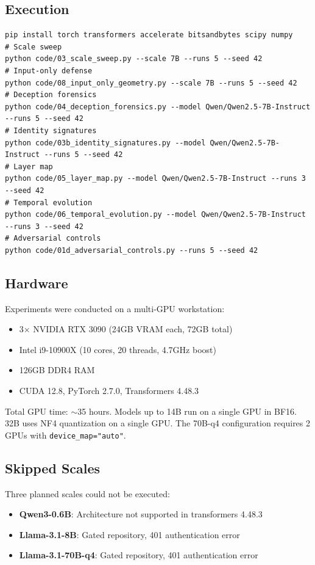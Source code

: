 \documentclass[11pt,a4paper]{article}
\begin{document}
\subsection{Execution}

\begin{verbatim}
pip install torch transformers accelerate bitsandbytes scipy numpy
# Scale sweep
python code/03_scale_sweep.py --scale 7B --runs 5 --seed 42
# Input-only defense
python code/08_input_only_geometry.py --scale 7B --runs 5 --seed 42
# Deception forensics
python code/04_deception_forensics.py --model Qwen/Qwen2.5-7B-Instruct --runs 5 --seed 42
# Identity signatures
python code/03b_identity_signatures.py --model Qwen/Qwen2.5-7B-Instruct --runs 5 --seed 42
# Layer map
python code/05_layer_map.py --model Qwen/Qwen2.5-7B-Instruct --runs 3 --seed 42
# Temporal evolution
python code/06_temporal_evolution.py --model Qwen/Qwen2.5-7B-Instruct --runs 3 --seed 42
# Adversarial controls
python code/01d_adversarial_controls.py --runs 5 --seed 42
\end{verbatim}

\subsection{Hardware}

Experiments were conducted on a multi-GPU workstation:
\begin{itemize}[leftmargin=*]
    \item 3$\times$ NVIDIA RTX 3090 (24GB VRAM each, 72GB total)
    \item Intel i9-10900X (10 cores, 20 threads, 4.7GHz boost)
    \item 126GB DDR4 RAM
    \item CUDA 12.8, PyTorch 2.7.0, Transformers 4.48.3
\end{itemize}

Total GPU time: $\sim$35 hours. Models up to 14B run on a single GPU in BF16. 32B uses NF4 quantization on a single GPU. The 70B-q4 configuration requires 2 GPUs with \texttt{device\_map="auto"}.

\subsection{Skipped Scales}

Three planned scales could not be executed:
\begin{itemize}[leftmargin=*]
    \item \textbf{Qwen3-0.6B}: Architecture not supported in transformers 4.48.3
    \item \textbf{Llama-3.1-8B}: Gated repository, 401 authentication error
    \item \textbf{Llama-3.1-70B-q4}: Gated repository, 401 authentication error
\end{itemize}
\end{document}
